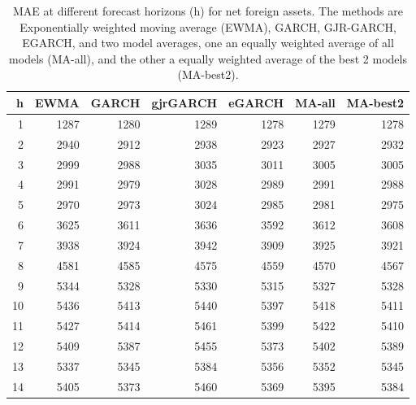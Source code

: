 \documentclass{article}
\begin{document}
\begin{table}[ht]
\centering
\begin{tabular}{rrrrrrr}
  \hline
h & EWMA & GARCH & gjrGARCH & eGARCH & MA-all & MA-best2 \\ 
  \hline
1 & 1287 & 1280 & 1289 & 1278 & 1279 & 1278 \\ 
  2 & 2940 & 2912 & 2938 & 2923 & 2927 & 2932 \\ 
  3 & 2999 & 2988 & 3035 & 3011 & 3005 & 3005 \\ 
  4 & 2991 & 2979 & 3028 & 2989 & 2991 & 2988 \\ 
  5 & 2970 & 2973 & 3024 & 2985 & 2981 & 2975 \\ 
  6 & 3625 & 3611 & 3636 & 3592 & 3612 & 3608 \\ 
  7 & 3938 & 3924 & 3942 & 3909 & 3925 & 3921 \\ 
  8 & 4581 & 4585 & 4575 & 4559 & 4570 & 4567 \\ 
  9 & 5344 & 5328 & 5330 & 5315 & 5327 & 5328 \\ 
  10 & 5436 & 5413 & 5440 & 5397 & 5418 & 5411 \\ 
  11 & 5427 & 5414 & 5461 & 5399 & 5422 & 5410 \\ 
  12 & 5409 & 5387 & 5455 & 5373 & 5402 & 5389 \\ 
  13 & 5337 & 5345 & 5384 & 5356 & 5352 & 5345 \\ 
  14 & 5405 & 5373 & 5460 & 5369 & 5395 & 5384 \\ 
   \hline
\end{tabular}
\caption{MAE at different forecast horizons (h) for net foreign assets. The methods are Exponentially weighted moving average (EWMA), GARCH, GJR-GARCH, EGARCH, and two model averages, one an equally weighted average of all models (MA-all), and the other a equally weighted average of the best 2 models (MA-best2).} 
\label{tab:maenfa}
\end{table}
\end{document}
